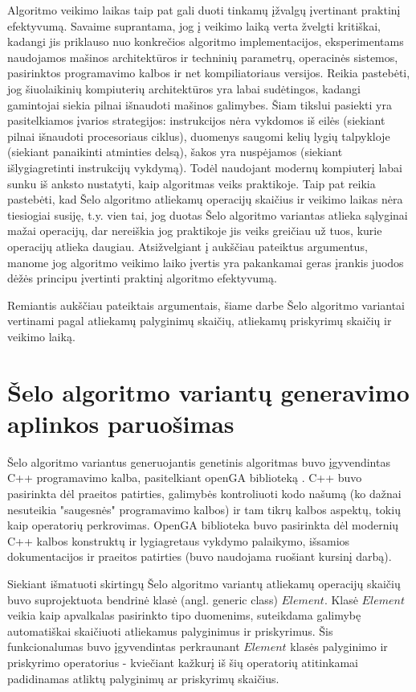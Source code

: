 \documentclass{VUMIFInfKursinis}
\begin{document}
Algoritmo veikimo laikas taip pat gali duoti tinkamų įžvalgų įvertinant praktinį efektyvumą.
Savaime suprantama, jog į veikimo laiką verta žvelgti kritiškai, kadangi jis priklauso nuo konkrečios algoritmo implementacijos,
eksperimentams naudojamos mašinos architektūros ir techninių parametrų, operacinės sistemos, pasirinktos programavimo kalbos ir net kompiliatoriaus versijos.
Reikia pastebėti, jog šiuolaikinių kompiuterių architektūros yra labai sudėtingos, kadangi gamintojai siekia pilnai išnaudoti mašinos galimybes.
Šiam tikslui pasiekti yra pasitelkiamos įvarios strategijos:
instrukcijos nėra vykdomos iš eilės (siekiant pilnai išnaudoti procesoriaus ciklus),
duomenys saugomi kelių lygių talpykloje (siekiant panaikinti atminties delsą),
šakos yra nuspėjamos (siekiant išlygiagretinti instrukcijų vykdymą).
Todėl naudojant modernų kompiuterį labai sunku iš anksto nustatyti, kaip algoritmas veiks praktikoje. 
Taip pat reikia pastebėti, kad Šelo algoritmo atliekamų operacijų skaičius ir veikimo laikas nėra tiesiogiai susiję, t.y.
vien tai, jog duotas Šelo algoritmo variantas atlieka sąlyginai mažai operacijų, dar nereiškia jog praktikoje jis veiks greičiau
už tuos, kurie operacijų atlieka daugiau. %
Atsižvelgiant į aukščiau pateiktus argumentus, manome jog
algoritmo veikimo laiko įvertis yra pakankamai geras įrankis juodos dėžės principu įvertinti praktinį algoritmo efektyvumą.

Remiantis aukščiau pateiktais argumentais, šiame darbe Šelo algoritmo variantai vertinami pagal
atliekamų palyginimų skaičių, atliekamų priskyrimų skaičių ir veikimo laiką.

\section{Šelo algoritmo variantų generavimo aplinkos paruošimas}

Šelo algoritmo variantus generuojantis genetinis algoritmas buvo įgyvendintas C++ programavimo kalba, pasitelkiant openGA biblioteką \cite{mohammadi2017openga}.
C++ buvo pasirinkta dėl praeitos patirties, galimybės kontroliuoti kodo našumą (ko dažnai nesuteikia "saugesnės" programavimo kalbos)
ir tam tikrų kalbos aspektų, tokių kaip operatorių perkrovimas.
OpenGA biblioteka buvo pasirinkta dėl modernių C++ kalbos konstruktų ir lygiagretaus vykdymo palaikymo, išsamios dokumentacijos ir praeitos patirties (buvo naudojama ruošiant kursinį darbą).

Siekiant išmatuoti skirtingų Šelo algoritmo variantų atliekamų operacijų skaičių buvo
suprojektuota bendrinė klasė (angl. generic class) $Element$.
Klasė $Element$ veikia kaip apvalkalas pasirinkto tipo duomenims, suteikdama
galimybę automatiškai skaičiuoti atliekamus palyginimus ir priskyrimus.
Šis funkcionalumas buvo įgyvendintas perkraunant $Element$ klasės palyginimo ir priskyrimo operatorius - kviečiant
kažkurį iš šių operatorių atitinkamai padidinamas atliktų palyginimų ar priskyrimų skaičius.
\end{document}
